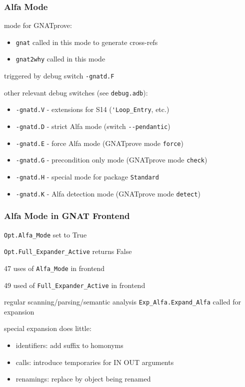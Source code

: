 \documentclass{beamer}
\newcommand{\vs}{\vspace{0.5cm}}
\newenvironment{specialframe}{%
  \begin{frame}[fragile,environment=specialframe]}{\end{frame}}
\begin{document}
\begin{specialframe}
  \frametitle{Alfa Mode}

mode for GNATprove:
\begin{itemize}
\item \verb|gnat| called in this mode to generate cross-refs
\item \verb|gnat2why| called in this mode
\end{itemize}

\vs

triggered by debug switch \verb|-gnatd.F|

\vs

other relevant debug switches (see \verb|debug.adb|):
\begin{itemize}
\item \verb|-gnatd.V| - extensions for S14 (\verb|'Loop_Entry|, etc.)
\item \verb|-gnatd.D| - strict Alfa mode (switch \verb|--pendantic|)
\item \verb|-gnatd.E| - force Alfa mode (GNATprove mode \verb|force|)
\item \verb|-gnatd.G| - precondition only mode (GNATprove mode \verb|check|)
\item \verb|-gnatd.H| - special mode for package \verb|Standard|
\item \verb|-gnatd.K| - Alfa detection mode (GNATprove mode \verb|detect|)
\end{itemize}

\end{specialframe}

\begin{specialframe}
  \frametitle{Alfa Mode in GNAT Frontend}

\verb|Opt.Alfa_Mode| set to True

\verb|Opt.Full_Expander_Active| returns False

\vs

47 uses of \verb|Alfa_Mode| in frontend

49 used of \verb|Full_Expander_Active| in frontend

\vs

regular scanning/parsing/semantic analysis
\verb|Exp_Alfa.Expand_Alfa| called for expansion

\vs

special expansion does little:
\begin{itemize}
\item identifiers: add suffix to homonyms
\item calls: introduce temporaries for IN OUT arguments
\item renamings: replace by object being renamed
\end{itemize}

\end{specialframe}
\end{document}
